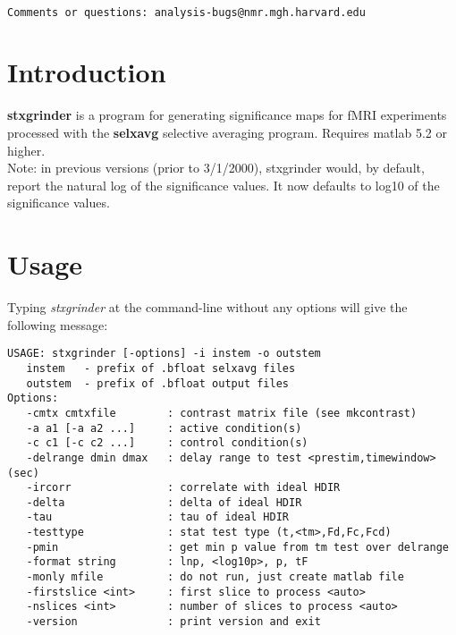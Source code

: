 \documentclass[10pt]{article}
\begin{document}
\begin{Large}
 \\
\end{Large}

\noindent 
\begin{verbatim}
Comments or questions: analysis-bugs@nmr.mgh.harvard.edu
\end{verbatim}

\section{Introduction}
{\bf stxgrinder} is a program for generating significance maps for
fMRI experiments processed with the {\bf selxavg} selective averaging
program.  Requires matlab 5.2 or higher.\\

Note: in previous versions (prior to 3/1/2000), stxgrinder would, by
default, report the natural log of the significance values.  It now
defaults to log10 of the significance values.

\section{Usage}
Typing {\em stxgrinder} at the command-line without any options will give the
following message:\\ 

\begin{small}
\begin{verbatim}
USAGE: stxgrinder [-options] -i instem -o outstem
   instem   - prefix of .bfloat selxavg files
   outstem  - prefix of .bfloat output files
Options:
   -cmtx cmtxfile        : contrast matrix file (see mkcontrast)
   -a a1 [-a a2 ...]     : active condition(s)
   -c c1 [-c c2 ...]     : control condition(s)
   -delrange dmin dmax   : delay range to test <prestim,timewindow> (sec)
   -ircorr               : correlate with ideal HDIR
   -delta                : delta of ideal HDIR
   -tau                  : tau of ideal HDIR
   -testtype             : stat test type (t,<tm>,Fd,Fc,Fcd)
   -pmin                 : get min p value from tm test over delrange
   -format string        : lnp, <log10p>, p, tF
   -monly mfile          : do not run, just create matlab file
   -firstslice <int>     : first slice to process <auto>
   -nslices <int>        : number of slices to process <auto>
   -version              : print version and exit
\end{verbatim}
\end{small}
\end{document}
